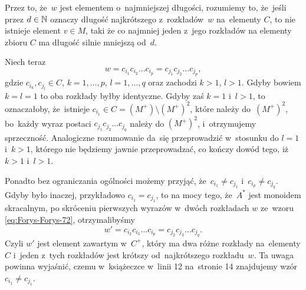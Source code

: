 \documentclass[a4paper,11pt]{article}
\begin{document}
Przez to, że~$w$ jest elementem o~najmniejszej długości, rozumiemy to,
że~jeśli przez $d \in \mathbb{N}$ oznaczy długość najkrótszego z~rozkładów~$w$
na~elementy $C$, to nie istnieje element $v \in M$, taki że co najmniej
jeden z~jego rozkładów na elementy zbioru $C$ ma długość silnie mniejszą
od~$d$.

Niech teraz
\begin{equation}
  \label{eq:Forys-Forys-72}
  w = c_{ i_{ 1 } } c_{ i_{ 2 } } \ldots c_{ i_{ p } } =
  c_{ j_{ 1 } } c_{ j_{ 2 } } \ldots c_{ j_{ p } },
\end{equation}
gdzie $c_{ i_{ k } }, c_{ j_{ l } } \in C$, $k = 1, \ldots, p$, $l = 1, \ldots, q$ oraz
zachodzi $k > 1$, $l > 1$. Gdyby bowiem $k = l = 1$ to oba rozkłady byłby
identyczne. Gdyby zaś $k = 1$ i~$l > 1$, to oznaczałoby,
że~istnieje $c_{ i_{ 1 } } \in C = ( M^{ + } ) \setminus ( M^{ + } )^{ 2 }$, które należy
do~$( M^{ + } )^{ 2 }$, bo~każdy wyraz postaci
$c_{ j_{ 1 } } c_{ j_{ 2 } } \ldots c_{ j_{ q } }$ należy do $( M^{ + } )^{ 2 }$,
i~otrzymujemy sprzeczność. Analogiczne rozumowanie da~się przeprowadzić
w~stosunku do $l = 1$ i~$k > 1$, którego nie będziemy jawnie przeprowadzać,
co kończy dowód tego, iż~$k > 1$ i~$l > 1$.

Ponadto bez ograniczania ogólności możemy przyjąć,
że~$c_{ i_{ 1 } } \neq c_{ j_{ 1 } }$ i~$c_{ i_{ p } } \neq c_{ j_{ q } }$. Gdyby było
inaczej, przykładowo $c_{ i_{ 1 } } = c_{ j_{ 1 } }$, to na mocy tego,
że~$A^{ * }$ jest monoidem skracalnym, po skróceniu pierwszych wyrazów
w~dwóch rozkładach $w$ ze~wzoru \eqref{eq:Forys-Forys-72}, otrzymalibyśmy
\begin{equation}
  \label{eq:Forys-Forys-73}
  w' = c_{ i_{ 2 } } c_{ i_{ 3 } } \ldots c_{ i_{ p } } =
  c_{ j_{ 2 } } c_{ j_{ 3 } } \ldots c_{ j_{ q } }.
\end{equation}
Czyli $w'$ jest element zawartym w~$C^{ + }$, który ma dwa różne rozkłady
na~elementy $C$ i~jeden z~tych rozkładów jest krótszy od~najkrótszego
rozkładu~$w$. Ta uwaga powinna wyjaśnić, czemu w~książeczce w~linii 12
na~stronie 14 znajdujemy wzór $c_{ i_{ 1 } } \neq c_{ j_{ 1 } }$.
\end{document}
